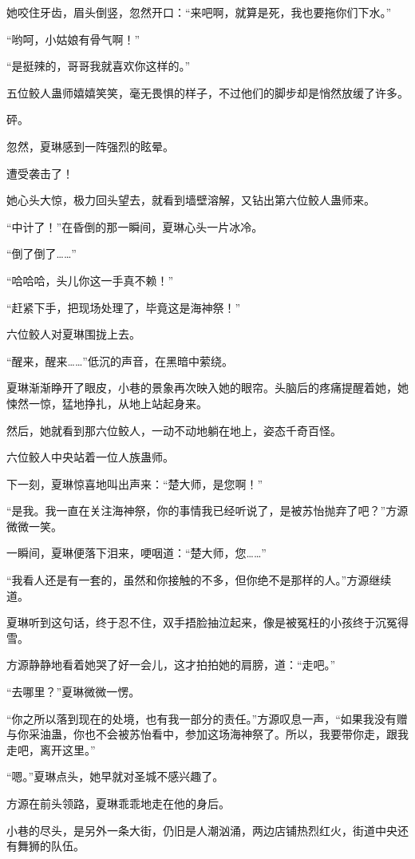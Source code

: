 \begin{this_body}
她咬住牙齿，眉头倒竖，忽然开口：“来吧啊，就算是死，我也要拖你们下水。”

“哟呵，小姑娘有骨气啊！”

“是挺辣的，哥哥我就喜欢你这样的。”

五位鲛人蛊师嬉嬉笑笑，毫无畏惧的样子，不过他们的脚步却是悄然放缓了许多。

砰。

忽然，夏琳感到一阵强烈的眩晕。

遭受袭击了！

她心头大惊，极力回头望去，就看到墙壁溶解，又钻出第六位鲛人蛊师来。

“中计了！”在昏倒的那一瞬间，夏琳心头一片冰冷。

“倒了倒了……”

“哈哈哈，头儿你这一手真不赖！”

“赶紧下手，把现场处理了，毕竟这是海神祭！”

六位鲛人对夏琳围拢上去。

“醒来，醒来……”低沉的声音，在黑暗中萦绕。

夏琳渐渐睁开了眼皮，小巷的景象再次映入她的眼帘。头脑后的疼痛提醒着她，她悚然一惊，猛地挣扎，从地上站起身来。

然后，她就看到那六位鲛人，一动不动地躺在地上，姿态千奇百怪。

六位鲛人中央站着一位人族蛊师。

下一刻，夏琳惊喜地叫出声来：“楚大师，是您啊！”

“是我。我一直在关注海神祭，你的事情我已经听说了，是被苏怡抛弃了吧？”方源微微一笑。

一瞬间，夏琳便落下泪来，哽咽道：“楚大师，您……”

“我看人还是有一套的，虽然和你接触的不多，但你绝不是那样的人。”方源继续道。

夏琳听到这句话，终于忍不住，双手捂脸抽泣起来，像是被冤枉的小孩终于沉冤得雪。

方源静静地看着她哭了好一会儿，这才拍拍她的肩膀，道：“走吧。”

“去哪里？”夏琳微微一愣。

“你之所以落到现在的处境，也有我一部分的责任。”方源叹息一声，“如果我没有赠与你采油蛊，你也不会被苏怡看中，参加这场海神祭了。所以，我要带你走，跟我走吧，离开这里。”

“嗯。”夏琳点头，她早就对圣城不感兴趣了。

方源在前头领路，夏琳乖乖地走在他的身后。

小巷的尽头，是另外一条大街，仍旧是人潮汹涌，两边店铺热烈红火，街道中央还有舞狮的队伍。


\end{this_body}
